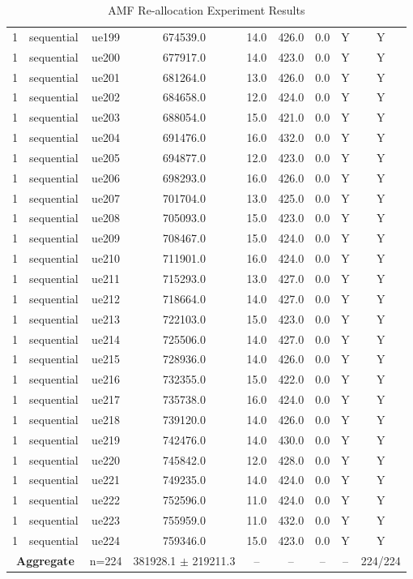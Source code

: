 \begin{table}[ht]
\begin{tabular}{|c|c|c|c|c|c|c|c|c|}
1 & sequential & ue199 & 674539.0 & 14.0 & 426.0 & 0.0 & Y & Y \\
1 & sequential & ue200 & 677917.0 & 14.0 & 423.0 & 0.0 & Y & Y \\
1 & sequential & ue201 & 681264.0 & 13.0 & 426.0 & 0.0 & Y & Y \\
1 & sequential & ue202 & 684658.0 & 12.0 & 424.0 & 0.0 & Y & Y \\
1 & sequential & ue203 & 688054.0 & 15.0 & 421.0 & 0.0 & Y & Y \\
1 & sequential & ue204 & 691476.0 & 16.0 & 432.0 & 0.0 & Y & Y \\
1 & sequential & ue205 & 694877.0 & 12.0 & 423.0 & 0.0 & Y & Y \\
1 & sequential & ue206 & 698293.0 & 16.0 & 426.0 & 0.0 & Y & Y \\
1 & sequential & ue207 & 701704.0 & 13.0 & 425.0 & 0.0 & Y & Y \\
1 & sequential & ue208 & 705093.0 & 15.0 & 423.0 & 0.0 & Y & Y \\
1 & sequential & ue209 & 708467.0 & 15.0 & 424.0 & 0.0 & Y & Y \\
1 & sequential & ue210 & 711901.0 & 16.0 & 424.0 & 0.0 & Y & Y \\
1 & sequential & ue211 & 715293.0 & 13.0 & 427.0 & 0.0 & Y & Y \\
1 & sequential & ue212 & 718664.0 & 14.0 & 427.0 & 0.0 & Y & Y \\
1 & sequential & ue213 & 722103.0 & 15.0 & 423.0 & 0.0 & Y & Y \\
1 & sequential & ue214 & 725506.0 & 14.0 & 427.0 & 0.0 & Y & Y \\
1 & sequential & ue215 & 728936.0 & 14.0 & 426.0 & 0.0 & Y & Y \\
1 & sequential & ue216 & 732355.0 & 15.0 & 422.0 & 0.0 & Y & Y \\
1 & sequential & ue217 & 735738.0 & 16.0 & 424.0 & 0.0 & Y & Y \\
1 & sequential & ue218 & 739120.0 & 14.0 & 426.0 & 0.0 & Y & Y \\
1 & sequential & ue219 & 742476.0 & 14.0 & 430.0 & 0.0 & Y & Y \\
1 & sequential & ue220 & 745842.0 & 12.0 & 428.0 & 0.0 & Y & Y \\
1 & sequential & ue221 & 749235.0 & 14.0 & 424.0 & 0.0 & Y & Y \\
1 & sequential & ue222 & 752596.0 & 11.0 & 424.0 & 0.0 & Y & Y \\
1 & sequential & ue223 & 755959.0 & 11.0 & 432.0 & 0.0 & Y & Y \\
1 & sequential & ue224 & 759346.0 & 15.0 & 423.0 & 0.0 & Y & Y \\
\multicolumn{2}{|c|}{\textbf{Aggregate}} & n=224 & 381928.1 $\pm$ 219211.3 & -- & -- & -- & -- & 224/224 \\
\hline
\end{tabular}
\caption{AMF Re-allocation Experiment Results}
\label{tab:amf_realloc}
\end{table}
